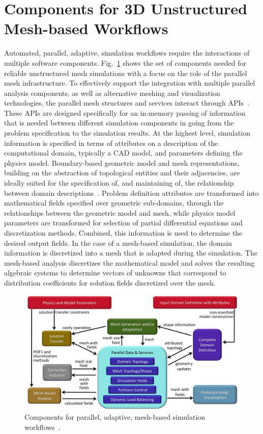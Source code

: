 \section{Components for 3D Unstructured Mesh-based Workflows}

Automated, parallel, adaptive, simulation workflows require the
interactions of multiple software components.
Fig.~\ref{fig:workflowInteractions} shows the set of components needed for
reliable unstructured mesh simulations with a focus on the role of the parallel
mesh infrastructure.
To effectively support the integration with multiple parallel analysis
components, as well as alternative meshing and visualization technologies, the
parallel mesh structures and services interact through
APIs~\cite{BeaWal,Ollivier10}.
These APIs are designed specifically for an in-memory passing
of information that is needed between different simulation components in going
from the problem specification to the simulation results.
At the highest level, simulation information is specified in terms of attributes
on a description of the computational domain, typically a CAD model, and parameters
defining the physics model.
Boundary-based geometric model and mesh representations, building on the
abstraction of topological entities and their adjacencies, are ideally suited
for the specification of, and maintaining of, the relationship between domain
descriptions~\cite{beall1997general,garimella2002mesh,haimes2003unified}.
Problem definition attributes are transformed into mathematical fields
specified over geometric sub-domains, through the relationships between the
geometric model and mesh, while physics model parameters are transformed for
selection of partial differential equations and discretization methods.
Combined, this information is used to determine the desired output fields.
In the case of a mesh-based simulation, the domain information is discretized
into a mesh that is adapted during the simulation.
The mesh-based analysis discretizes the mathematical model and solves the
resulting algebraic systems to determine vectors of unknowns that correspond to
distribution coefficients for solution fields discretized over the mesh.

\begin{figure} \centering
  \includegraphics[width=.80\textwidth]{figures/workflowComponentInteractions.jpg}
  \caption{
    Components for parallel, adaptive, mesh-based simulation
    workflows~\cite{ibanez2016pumi}.
  }\label{fig:workflowInteractions}
\end{figure}

